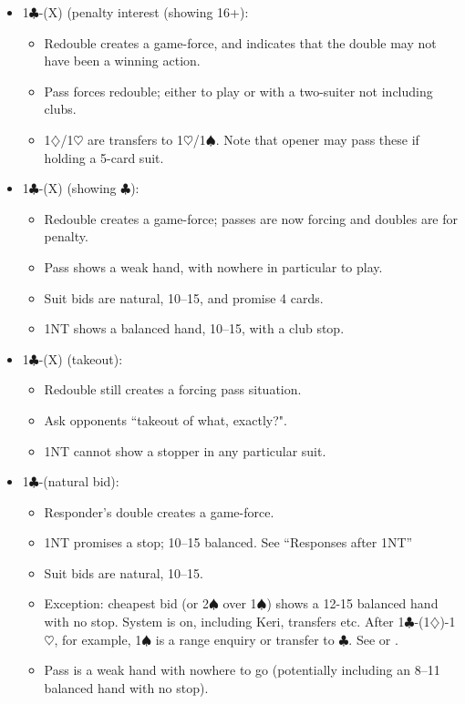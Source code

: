 \documentclass[a4paper,14pt]{extarticle}
\begin{document}
\begin{itemize}
\item 1$\clubsuit$-(X) (penalty interest (showing 16+):
	\begin{itemize}
   \item Redouble creates a game-force, and indicates that the double may not have been 
      a winning action.
   \item Pass forces redouble; either to play or with a two-suiter not including clubs.
   \item 1$\diamondsuit$/1$\heartsuit$ are transfers to 1$\heartsuit$/1$\spadesuit$.  Note that opener may pass these if holding a 5-card 
      suit.
	\end{itemize}
\newpage
\item 1$\clubsuit$-(X) (showing $\clubsuit$):
	\begin{itemize}
   \item Redouble creates a game-force; passes are now forcing and doubles are for penalty.
   \item Pass shows a weak hand, with nowhere in particular to play.
   \item Suit bids are natural, 10--15, and promise 4 cards.
   \item 1NT shows a balanced hand, 10--15, with a club stop.
	\end{itemize}
\item 1$\clubsuit$-(X) (takeout):
	\begin{itemize}
   \item Redouble still creates a forcing pass situation.
   \item Ask opponents ``takeout of what, exactly?".
   \item 1NT cannot show a stopper in any particular suit.
	\end{itemize}
\item 1$\clubsuit$-(natural bid):
	\begin{itemize}
   \item Responder's double creates a game-force.
   \item 1NT promises a stop; 10--15 balanced. See ``Responses after 1NT'' 
   \item Suit bids are natural, 10--15.
   \item Exception: cheapest bid (or 2$\spadesuit$ over 1$\spadesuit$) shows a 12-15 balanced hand with no stop.  System is on, including Keri, transfers etc.  After 1$\clubsuit$-(1$\diamondsuit$)-1$\heartsuit$, for example, 1$\spadesuit$ is a range enquiry or transfer to $\clubsuit$. See  or .
   \item Pass is a weak hand with nowhere to go (potentially including an 8--11 balanced hand with no stop).
	\end{itemize}
\end{itemize}
\end{document}
